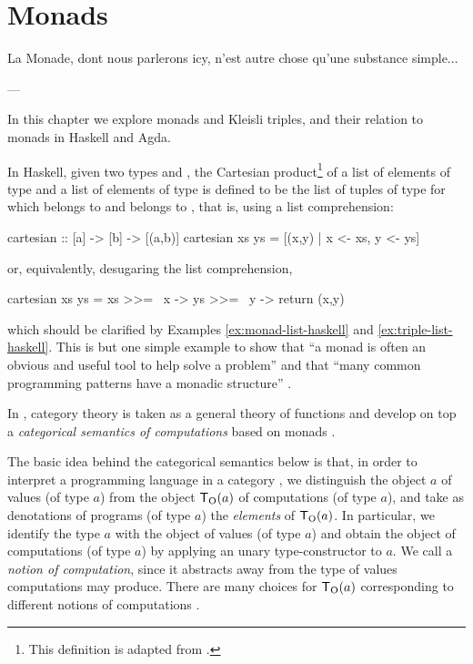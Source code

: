 \chapter{Monads}
\label{chap:monads}

\epigraph{
  La Monade, dont nous parlerons icy, n'est autre chose qu'une
  substance simple...
}{---\textcite[1]{leibniz-1714}}

In this chapter we explore monads and Kleisli triples, and their
relation to monads in Haskell and Agda.

In Haskell, given two types  and , the
Cartesian product\footnote{This definition is adapted from
  \parencite{weisstein-cartesian}.} of a list  of
elements of type  and a list  of
elements of type  is defined to be the list of tuples
 of type  for which
 belongs to  and 
belongs to , that is, using a list comprehension:
\begin{codehaskell}
cartesian :: [a] -> [b] -> [(a,b)]
cartesian xs ys = [(x,y) | x <- xs, y <- ys]
\end{codehaskell}
or, equivalently, desugaring the list comprehension,
\begin{codehaskell}
cartesian xs ys = xs >>= \ x -> ys >>= \ y -> return (x,y)
\end{codehaskell}
which should be clarified by Examples \ref{ex:monad-list-haskell} and
\ref{ex:triple-list-haskell}. This is but one simple example to show
that ``a monad is often an obvious and useful tool to help solve a
problem'' \parencite[325]{osullivan-2008} and that ``many common
programming patterns have a monadic structure''
\parencite[328]{osullivan-2008}.



In \parencite{moggi-1991}, category theory is taken as a general
theory of functions and develop on top a \emph{categorical semantics
  of computations} based on monads \parencite[56]{moggi-1991}.

The basic idea behind the categorical semantics below is that, in
order to interpret a programming language in a category , we
distinguish the object $a$ of values (of type $a$) from the object
$\mathsf{T}_{\operatorname{O}}(a)$ of computations (of type $a$), and take as denotations
of programs (of type $a$) the \emph{elements} of $\mathsf{T}_{\operatorname{O}}(a)$. In
particular, we identify the type $a$ with the object of values (of
type $a$) and obtain the object of computations (of type $a$) by
applying an unary type-constructor  to $a$. We call 
a \emph{notion of computation}, since it abstracts away from the type
of values computations may produce. There are many choices for
$\mathsf{T}_{\operatorname{O}}(a)$ corresponding to different notions of computations
\parencite[57--58]{moggi-1991}.


